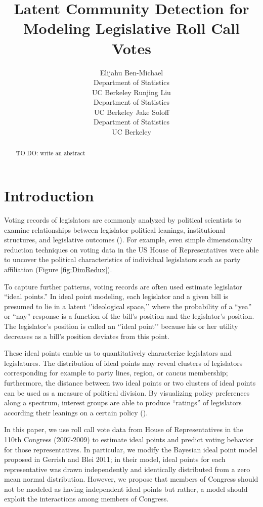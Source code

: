 \documentclass{article}
\title{Latent Community Detection for Modeling Legislative Roll Call Votes}
\author{
  Elijahu Ben-Michael \\
  Department of Statistics\\
  UC Berkeley
   \And
  Runjing Liu \\
  Department of Statistics\\
  UC Berkeley
   \And
  Jake Soloff \\
  Department of Statistics\\
  UC Berkeley
}
\begin{document}

\maketitle

\vspace{-1em}

\begin{abstract}
{\color{red} TO DO: write an abstract}
\end{abstract}

\section{Introduction}
\label{introduction}
Voting records of legislators are commonly analyzed by political scientists to examine relationships between legislator political leanings, institutional structures, and legislative outcomes (\cite{Clinton2004}). For example, even simple dimensionality reduction techniques on voting data in the US House of Representatives were able to uncover the political characteristics of individual legislators such as party affiliation (Figure \ref{fig:DimRedux}). \par

To capture further patterns, voting records are often used estimate legislator ``ideal points.'' In ideal point modeling, each legislator and a given bill is presumed to lie in a latent `'ideological space,'' where the probability of a ``yea'' or ``nay'' response is a function of the bill's position and the legislator's position. The legislator's position is called an `'ideal point'' because his or her utility decreases as a bill's position deviates from this point. \par

These ideal points enable us to quantitatively characterize legislators and legislatures. The distribution of ideal points may reveal clusters of legislators corresponding for example to party lines, region, or caucus membership; furthermore, the distance between two ideal points or two clusters of ideal points can be used as  a measure of political division. By visualizing policy preferences along a spectrum, interest groups are able to produce ``ratings'' of legislators according their leanings on a certain policy (\cite{Clinton2004}). \par

In this paper, we use roll call vote data from House of Representatives in the 110th Congress (2007-2009) to estimate ideal points and predict voting behavior for those representatives. In particular, we modify the Bayesian ideal point model proposed in Gerrish and Blei 2011; in their model, ideal points for each representative was drawn independently and identically distributed from a zero mean normal distribution. However, we propose that members of Congress should not be modeled as having independent ideal points but rather, a model should exploit the interactions among members of Congress. \par
\end{document}
